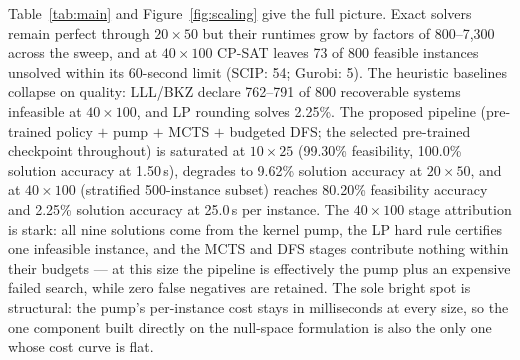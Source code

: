 \documentclass[12pt]{article}
\begin{document}
Table~\ref{tab:main} and Figure~\ref{fig:scaling} give the full picture. Exact solvers remain perfect through $20 \times 50$ but their runtimes grow by factors of 800--7{,}300 across the sweep, and at $40 \times 100$ CP-SAT leaves 73 of 800 feasible instances unsolved within its 60-second limit (SCIP: 54; Gurobi: 5). The heuristic baselines collapse on quality: LLL/BKZ declare 762--791 of 800 recoverable systems infeasible at $40 \times 100$, and LP rounding solves 2.25\%. The proposed pipeline (pre-trained policy $+$ pump $+$ MCTS $+$ budgeted DFS; the selected pre-trained checkpoint throughout) is saturated at $10 \times 25$ (99.30\% feasibility, 100.0\% solution accuracy at 1.50\,s), degrades to 9.62\% solution accuracy at $20 \times 50$, and at $40 \times 100$ (stratified 500-instance subset) reaches 80.20\% feasibility accuracy and 2.25\% solution accuracy at 25.0\,s per instance. The $40 \times 100$ stage attribution is stark: all nine solutions come from the kernel pump, the LP hard rule certifies one infeasible instance, and the MCTS and DFS stages contribute nothing within their budgets --- at this size the pipeline is effectively the pump plus an expensive failed search, while zero false negatives are retained. The sole bright spot is structural: the pump's per-instance cost stays in milliseconds at every size, so the one component built directly on the null-space formulation is also the only one whose cost curve is flat.
\end{document}
